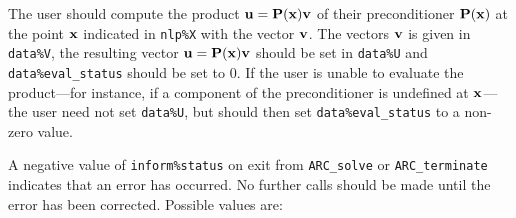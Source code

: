 \documentclass{galahad}
\newcommand{\packagename}{ARC}
\begin{document}
\begin{description}
 The user should compute the product ${\mathbf{u}} = {\mathbf{P}}({\mathbf{x}}){\mathbf{v}}$
     of their preconditioner ${\mathbf{P}}({\mathbf{x}})$ at the point ${\mathbf{x}}$
     indicated in {\tt nlp\%X} with the vector ${\mathbf{v}}$.
     The vectors ${\mathbf{v}}$ is given in {\tt data\%V}, the
     resulting vector ${\mathbf{u}} = {\mathbf{P}}({\mathbf{x}}){\mathbf{v}}$ should be set in {\tt data\%U}
     and {\tt data\%eval\_status}
     should be set to 0. If the user is unable to evaluate the product---for
     instance, if a component of the preconditioner is undefined at
     ${\mathbf{x}}$---the user need not set {\tt data\%U}, but should then set
     {\tt data\%eval\_status} to a non-zero value.

\end{description}



\galerrors
A negative value of {\tt inform\%status} on exit from
{\tt \packagename\_solve}
or
{\tt \packagename\_terminate}
indicates that an error has occurred. No further calls should be made
until the error has been corrected. Possible values are:
\end{document}
